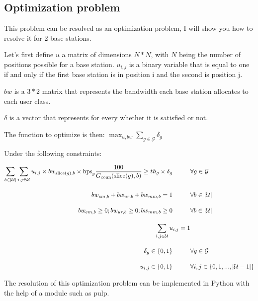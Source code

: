\documentclass[letterpaper]{article}
\begin{document}
\subsection{Optimization problem}

This problem can be resolved as an optimization problem, I will show you how to resolve it for 2 base stations.

Let's first define $u$ a matrix of dimensions $N*N$, with $N$ being the number of positions possible for a base station.
$u_{i,j}$ is a binary variable that is equal to one if and only if the first base station is in position i and the second is position j.

$bw$ is a $3*2$ matrix that represents the bandwidth each base station allocates to each user class.

$\delta$ is a vector that represents for every whether it is satisfied or not.

The function to optimize is then: $\max_{u,bw}\sum_{g\in\mathcal{G}}\delta_g$

Under the following constraints:

\begin{subequations}
    \allowdisplaybreaks
    \begin{align}
        \sum_{b \in |\mathcal{U}|} \sum_{i, j \in \mathcal{U}} u_{i, j} \times bw_{\text{slice}(g), b} \times \text{bps}_g \frac{100}{G_{\text{conn}}(\text{slice}(g),b)} \nonumber
        \geq th_g \times \delta_g \hspace{1cm} &\forall g \in \mathcal{G} \\[1em]
        bw_{em,b} + bw_{ur,b} + bw_{mm,b} = 1 \hspace{1cm} &\forall b \in |\mathcal{U}| \\[1em]
        bw_{em,b} \geq 0; bw_{ur,b} \geq 0; bw_{mm,b} \geq 0 \hspace{1cm} &\forall b \in |\mathcal{U}| \\[1em]
        \sum_{i,j \in \mathcal{U}}u_{i,j} = 1 &\\[1em]
        \delta_g \in \{0, 1\} \hspace{1cm} &\forall g \in \mathcal{G} \\[1em] 
        u_{i,j} \in \{0, 1\} \hspace{1cm} &\forall i,j \in \{0, 1, ... , |\mathcal{U}-1|\}
    \end{align}\label{constr}
    \end{subequations}

The resolution of this optimization problem can be implemented in Python with the help of a module such as pulp.
\end{document}

